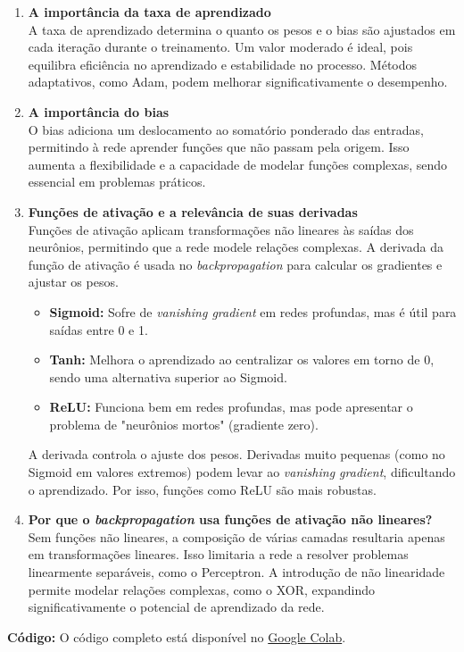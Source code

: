 \documentclass[12pt]{article}
\begin{document}
\begin{enumerate}

	\item \textbf{A importância da taxa de aprendizado} \\
		A taxa de aprendizado determina o quanto os pesos e o bias são ajustados em cada iteração durante o treinamento. Um valor moderado é ideal, pois equilibra eficiência no aprendizado e estabilidade no processo. Métodos adaptativos, como Adam, podem melhorar significativamente o desempenho.

	\item \textbf{A importância do bias} \\
		O bias adiciona um deslocamento ao somatório ponderado das entradas, permitindo à rede aprender funções que não passam pela origem. Isso aumenta a flexibilidade e a capacidade de modelar funções complexas, sendo essencial em problemas práticos.

	\item \textbf{Funções de ativação e a relevância de suas derivadas} \\
		Funções de ativação aplicam transformações não lineares às saídas dos neurônios, permitindo que a rede modele relações complexas. A derivada da função de ativação é usada no \textit{backpropagation} para calcular os gradientes e ajustar os pesos.

		\begin{itemize}
			\item \textbf{Sigmoid:} Sofre de \textit{vanishing gradient} em redes profundas, mas é útil para saídas entre 0 e 1.
			\item \textbf{Tanh:} Melhora o aprendizado ao centralizar os valores em torno de 0, sendo uma alternativa superior ao Sigmoid.
			\item \textbf{ReLU:} Funciona bem em redes profundas, mas pode apresentar o problema de "neurônios mortos" (gradiente zero).
		\end{itemize}

		A derivada controla o ajuste dos pesos. Derivadas muito pequenas (como no Sigmoid em valores extremos) podem levar ao \textit{vanishing gradient}, dificultando o aprendizado. Por isso, funções como ReLU são mais robustas.

	\item \textbf{Por que o \textit{backpropagation} usa funções de ativação não lineares?} \\
		Sem funções não lineares, a composição de várias camadas resultaria apenas em transformações lineares. Isso limitaria a rede a resolver problemas linearmente separáveis, como o Perceptron. A introdução de não linearidade permite modelar relações complexas, como o XOR, expandindo significativamente o potencial de aprendizado da rede.
\end{enumerate}

\noindent \textbf{Código:} O código completo está disponível no \href{https://colab.research.google.com/drive/1TYKmfnGl8PGT1hnLn21a9-bw0shOEvjm?usp=sharing}{Google Colab}.
\end{document}
